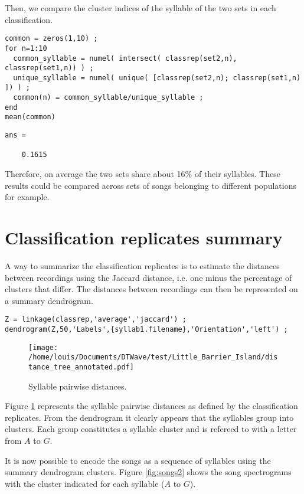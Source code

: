\documentclass[a4paper]{article}
\begin{document}
Then, we compare the cluster indices of the syllable of the two sets in each classification.

\begin{verbatim}
common = zeros(1,10) ;
for n=1:10
  common_syllable = numel( intersect( classrep(set2,n), classrep(set1,n)) ) ;
  unique_syllable = numel( unique( [classrep(set2,n); classrep(set1,n) ]) ) ;
  common(n) = common_syllable/unique_syllable ;
end
mean(common)
\end{verbatim}

\color{lightgray}
\begin{verbatim}
ans =

    0.1615
\end{verbatim}
\color{black}

Therefore, on average the two sets share about 16\% of their syllables.
These results could be compared across sets of songs belonging to different populations for example.

\section{Classification replicates summary}
A way to summarize the classification replicates is to estimate the distances between recordings using the Jaccard distance, i.e. one minus the percentage of clusters that differ.
The distances between recordings can then be represented on a summary dendrogram.

\begin{verbatim}
Z = linkage(classrep,'average','jaccard') ;
dendrogram(Z,50,'Labels',{syllab1.filename},'Orientation','left') ;
\end{verbatim}

\begin{figure}[h!]
\begin{center}
\texttt{[image: /home/louis/Documents/DTWave/test/Little\_Barrier\_Island/distance\_tree\_annotated.pdf]}
\caption{Syllable pairwise distances.}
\end{center}
\label{fig:tree}
\end{figure}

Figure \ref{fig:tree} represents the syllable pairwise distances as defined by the classification replicates.
From the dendrogram it clearly appears that the syllables group into clusters.
Each group constitutes a syllable cluster and is refereed to with a letter from \(A\) to \(G\).

It is now possible to encode the songs as a sequence of syllables using the summary dendrogram clusters.
Figure \ref{fig:songs2} shows the song spectrograms with the cluster indicated for each syllable (\(A\) to \(G\)).
\end{document}
